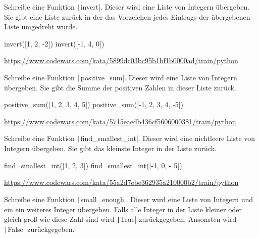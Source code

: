 \documentclass[class=scrartcl, crop=false]{standalone}
\begin{document}
\begin{aufgabe}
Schreibe eine Funktion \texttt|invert|. Dieser wird eine Liste von Integern übergeben. Sie gibt eine Liste zurück in der das Vorzeichen jedes Eintrags der übergebenen Liste umgedreht wurde.

\begin{pyconsole}
invert([1, 2, -2])
invert([-1, 4, 0])
\end{pyconsole}

\url{https://www.codewars.com/kata/5899dc03bc95b1bf1b0000ad/train/python}

\end{aufgabe}




\begin{aufgabe}
Schreibe eine Funktion \texttt|positive_sum|. Dieser wird eine Liste von Integern übergeben.  Sie gibt die Summe der positiven Zahlen in dieser Liste zurück.

\begin{pyconsole}
positive_sum([1, 2, 3, 4, 5])
positive_sum([-1, 2, 3, 4, -5])
\end{pyconsole}


\url{https://www.codewars.com/kata/5715eaedb436cf5606000381/train/python}
\end{aufgabe}



\begin{aufgabe}
Schreibe eine Funktion  \texttt|find_smallest_int|. Dieser wird eine nichtleere Liste von Integern übergeben. Sie gibt das kleinste Integer in der Liste zurück.

\begin{pyconsole}
find_smallest_int([1, 2, 3])
find_smallest_int([-1, 0, - 5])
\end{pyconsole}

\url{https://www.codewars.com/kata/55a2d7ebe362935a210000b2/train/python}
\end{aufgabe}



\begin{aufgabe}
Schreibe eine Funktion \texttt|small_enough|. Dieser wird eine Liste von Integern und ein ein weiteres Integer übergeben. Falls alle Integer in der Liste kleiner oder gleich groß wie diese Zahl sind wird \texttt|True| zurückgegeben. Ansonsten wird \texttt|False| zurückgegeben.
\end{aufgabe}
\end{document}
